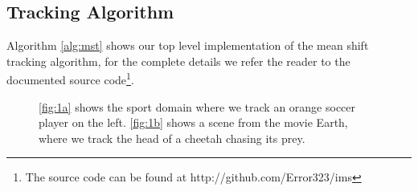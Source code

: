 \documentclass[11pt]{article}
\begin{document}
\subsection{Tracking Algorithm} \label{sec:mst}
Algorithm \ref{alg:mst} shows our top level implementation of the mean shift
tracking algorithm, for the complete details we refer the reader to the
documented source code\footnote{The source code can be found at
http://github.com/Error323/ims}.

\begin{figure}
\centering
{}
\caption{\ref{fig:1a} shows the sport domain where we track an orange soccer
player on the left. \ref{fig:1b} shows a scene from the movie Earth, where we
track the head of a cheetah chasing its prey.}
\label{fig:videos}
\end{figure}
\end{document}
